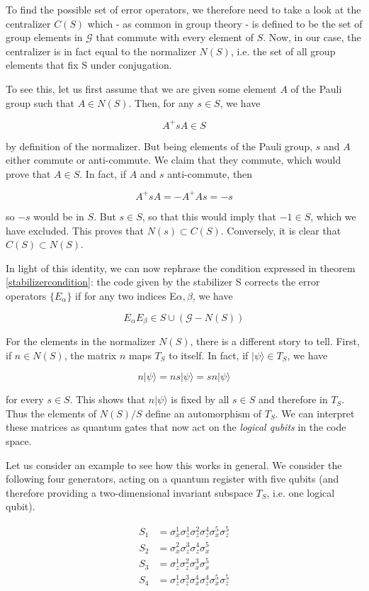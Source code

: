 \documentclass[a4paper, draft]{article}
\theoremstyle{own}
\theoremstyle{remark}
\begin{document}
To find the possible set of error operators, we therefore need to take a look at the centralizer $C(S)$ which - as common in group theory - is defined to be the set of group elements in $\mathcal{G}$ that commute with every element of $S$. Now, in our case, the centralizer is in fact equal to the normalizer $N(S)$, i.e. the set of all group elements that fix S under conjugation. 

To see this, let us first assume that we are given some element $A$ of the Pauli group such that $A \in N(S)$. Then, for any $s \in S$, we have

$$
A^+ s A \in S
$$

by definition of the normalizer. But being elements of the Pauli group, $s$ and $A$ either commute or anti-commute. We claim that they commute, which would prove that $A \in S$. In fact, if $A$ and $s$ anti-commute, then

$$
A^+ s A = - A^+ A s = - s
$$

so $-s$ would be in $S$. But $s \in S$, so that this would imply that $-1 \in S$, which we have excluded. This proves that $N(s) \subset C(S)$. Conversely, it is clear that $C(S) \subset N(S)$.

In light of this identity, we can now rephrase the condition expressed in theorem \ref{stabilizercondition}: the code given by the stabilizer S corrects the error operators $\{ E_\alpha \}$ if for any two indices E$\alpha, \beta$, we have 

$$
E_\alpha E_\beta \in S \cup (\mathcal{G} - N(S))
$$

For the elements in the normalizer $N(S)$, there is a different story to tell. First, if $n \in N(S)$, the matrix $n$ maps $T_S$ to itself. In fact, if $|\psi\rangle  \in T_S$, we have

$$
n |\psi\rangle = n s |\psi \rangle = s n | \psi \rangle
$$

for every $s \in S$. This shows that $n |\psi \rangle$ is fixed by all $s \in S$ and therefore in $T_S$. Thus the elements of $N(S) / S$ define an automorphism of $T_S$. We can interpret these matrices as quantum gates that now act on the \emph{logical qubits} in the code space.

Let us consider an example to see how this works in general. We consider the following four generators, acting on a quantum register with five qubits (and therefore providing a two-dimensional invariant subspace $T_S$, i.e. one logical qubit).

\begin{align*}
S_1 &= \sigma_x^1 \sigma_z^1 \sigma_z^2 \sigma_z^4 \sigma_x^5 \sigma_z^5 \\
S_2 &= \sigma_x^2 \sigma_z^3 \sigma_z^4 \sigma_x^5 \\
S_3 &= \sigma_z^1 \sigma_z^2 \sigma_x^3  \sigma_x^5 \\
S_4 &= \sigma_z^1 \sigma_z^3 \sigma_x^4 \sigma_z^4 \sigma_x^5 \sigma_z^5
\end{align*}
\end{document}
